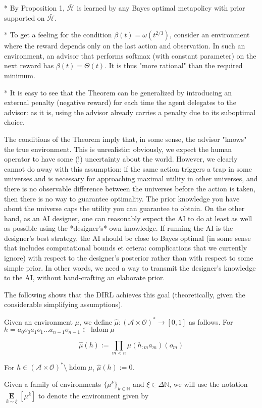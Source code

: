 \documentclass[a4paper]{article}
\newcommand{\Nats}{\mathbb{N}}
\newcommand{\Ob}{\mathcal{O}}
\newcommand{\A}{\mathcal{A}}
\newcommand{\FH}{(\A \times \Ob)^*}
\DeclareMathOperator{\HD}{hdom}
\newcommand{\Hy}{\mathcal{H}}
\newcommand{\BE}[1]{\underset{#1}{\boldsymbol{\operatorname{E}}}}
\begin{document}
* By Proposition 1, $\bar{\Hy}$ is learned by any Bayes optimal metapolicy with prior supported on $\bar{\Hy}$.

* To get a feeling for the condition $\beta(t)=\omega(t^{2/3})$, consider an environment where the reward depends only on the last action and observation. In such an environment, an advisor that performs softmax (with constant parameter) on the next reward has $\beta(t) = \Theta(t)$. It is thus "more rational" than the required minimum.

* It is easy to see that the Theorem can be generalized by introducing an external penalty (negative reward) for each time the agent delegates to the advisor: as it is, using the advisor already carries a penalty due to its suboptimal choice.

The conditions of the Theorem imply that, in some sense, the advisor "knows" the true environment. This is unrealistic: obviously, we expect the human operator to have some (!) uncertainty about the world. However, we clearly cannot do away with this assumption: if the same action triggers a trap in some universes and is necessary for approaching maximal utility in other universes, and there is no observable difference between the universes before the action is taken, then there is no way to guarantee optimality. The prior knowledge you have about the universe caps the utility you can guarantee to obtain. On the other hand, as an AI designer, one can reasonably expect the AI to do at least as well as possible using the *designer's* own knowledge. If running the AI is the designer's best strategy, the AI should be close to Bayes optimal (in some sense that includes computational bounds et cetera: complications that we currently ignore) with respect to the designer's posterior rather than with respect to some simple prior. In other words, we need a way to transmit the designer's knowledge to the AI, without hand-crafting an elaborate prior.

The following shows that the DIRL achieves this goal (theoretically, given the considerable simplifying assumptions). 

Given an environment $\mu$, we define $\hat{\mu}: \FH \rightarrow [0,1]$ as follows. For $h = a_0 o_0 a_1 o_1 \ldots a_{n-1} o_{n-1} \in \HD{\mu}$

$$\hat{\mu}(h):=\prod_{m < n} \mu(h_{:m}a_m)(o_m)$$

For $h \in \FH \setminus \HD{\mu}$, $\hat{\mu}(h):=0$.

Given a family of environments $\{\mu^k\}_{k \in \Nats}$ and $\xi \in \Delta\Nats$, we will use the notation $\BE{k \sim \xi}[\mu^k]$ to denote the environment given by
\end{document}
